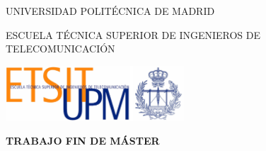 
\begin{titlepage}
	\centering
	{\scshape\LARGE UNIVERSIDAD POLITÉCNICA DE MADRID \par}
	\vspace{0.5cm}
	{\scshape\Large ESCUELA TÉCNICA SUPERIOR DE INGENIEROS DE TELECOMUNICACIÓN \par}
	\vspace{0.5cm}	
	\includegraphics[width=0.5\textwidth]{./img/01_front/logoescuela.jpg}\par\vspace{1cm} %
	{\huge\bfseries TRABAJO FIN DE MÁSTER\par}
	\vspace{0.5cm}
	{\scshape\Large \MakeUppercase{\myMaster} \par}
	\vspace{1cm}
	{\huge\bfseries \MakeUppercase{\myTitleEN} \par}
	\vspace{1cm}
	{\Large \MakeUppercase{\myFullname} \par}
	\vfill
	{\large \currentYear \par}
\end{titlepage}


\afterpage{\blankpage}
\cleardoublepage